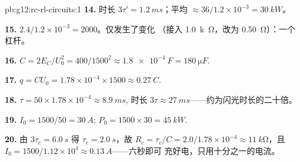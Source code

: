 \begin{solution}{pb:g12:rc-rl-circuits:1}
\textbf{14.} 时长 $3\tau' = \qty{1.2}{ms}$；平均
$\approx 36/1.2\times10^{-3} = \qty{30}{kW}$。

\textbf{15.} $2.4/1.2\times10^{-3} = 2000$。仅发生了变化
（接入 \qty{1.0}{k\ohm}，改为 \qty{0.50}{\ohm}）：一个杠杆。

\textbf{16.} $C = 2E_C/U_0^2 = 400/1500^2 \approx \qty{1.8e-4}{F} =
\qty{180}{\micro F}$.

\textbf{17.} $q = CU_0 = 1.78\times10^{-4} \times 1500 \approx
\qty{0.27}{C}$.

\textbf{18.} $\tau = 50 \times 1.78\times10^{-4} \approx \qty{8.9}{ms}$,
时长 $3\tau \approx \qty{27}{ms}$——约为闪光时长的二十倍。

\textbf{19.} $I_0 = 1500/50 = \qty{30}{A}$;
$P_0 = 1500 \times 30 = \qty{45}{kW}$.

\textbf{20.} 由 $3\tau_c = \qty{6.0}{s}$ 得 $\tau_c = \qty{2.0}{s}$，故
$R_c = \tau_c/C = 2.0/1.78\times10^{-4} \approx \qty{11}{k\ohm}$，且
$I_0 = 1500/1.12\times10^{4} \approx \qty{0.13}{A}$——六秒即可
充好电，只用十分之一的电流。
\end{solution}
